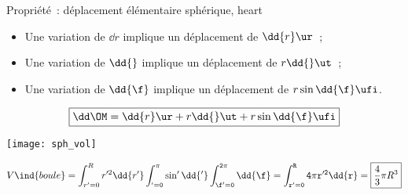 \documentclass[../main/main.tex]{subfiles}
\begin{document}
\begin{tprop}{Propriété~: déplacement élémentaire sphérique, heart}
	\begin{minipage}{0.70\linewidth}
		\begin{itemize}
			\item Une variation de $\dd{r}$ implique un déplacement de $\dd{r}\ur$~;
			\item Une variation de $\dd{\tt}$ implique un déplacement de
			      $r\dd{\tt}\ut$~;
			\item Une variation de $\dd{\f}$ implique un déplacement de
			      $r\sin\tt\dd{\f}\ufi$.
		\end{itemize} \bigbreak
		\[\boxed{\dd\OM = \dd{r}\ur + r\dd{\tt}\ut + r\sin\tt\dd{\f}\ufi}\]
	\end{minipage}
	\hfill
	\begin{minipage}{0.29\linewidth}
		\begin{center}
			\texttt{[image: sph\_vol]}
		\end{center}
	\end{minipage}
\end{tprop}

\[V\ind{boule}
	= \int_{r'=0}^{R} r'^2\dd{r'}
	\int_{\tt' = 0}^{\pi} \sin\tt'\dd{\tt'}
	\int_{\f'=0}^{2\pi} \dd{\f}
	= \int_{r'=0}^{R} 4\pi r'^2 \dd{r}
	= \boxed{\frac{4}{3}\pi R^3}
\]
\end{document}
